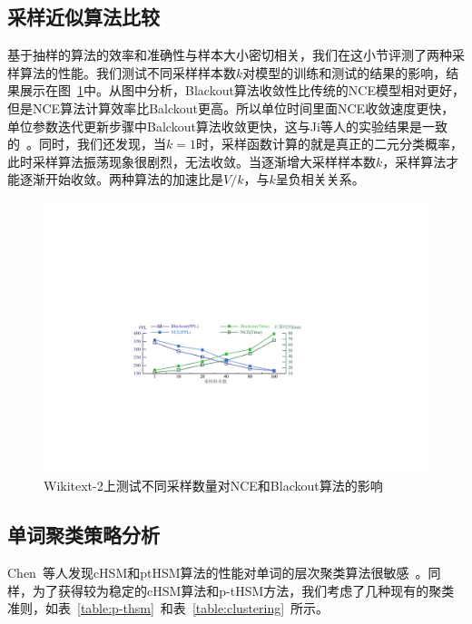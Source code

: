 \subsection{采样近似算法比较}

基于抽样的算法的效率和准确性与样本大小密切相关，我们在这小节评测了两种采样算法的性能。我们测试不同采样样本数$k$对模型的训练和测试的结果的影响，结果展示在图~\ref{fig:blackout_nce}中。从图中分析，Blackout算法收敛性比传统的NCE模型相对更好，但是NCE算法计算效率比Balckout更高。所以单位时间里面NCE收敛速度更快，单位参数迭代更新步骤中Balckout算法收敛更快，这与Ji等人的实验结果是一致的~。同时，我们还发现，当$k=1$时，采样函数计算的就是真正的二元分类概率，此时采样算法振荡现象很剧烈，无法收敛。当逐渐增大采样样本数$k$，采样算法才能逐渐开始收敛。两种算法的加速比是$ V / k $，与$k$呈负相关关系。



\begin{figure}[!ht]
  \centering
  \includegraphics[width=.85\columnwidth]{./figures/nce_blackout.pdf}
  \caption{Wikitext-2上测试不同采样数量对NCE和Blackout算法的影响}\label{fig:blackout_nce}
\end{figure}


\subsection{单词聚类策略分析}
Chen~等人发现cHSM和ptHSM算法的性能对单词的层次聚类算法很敏感~。同样，为了获得较为稳定的cHSM算法和p-tHSM方法，我们考虑了几种现有的聚类准则，如表~\ref{table:p-thsm}~和表~\ref{table:clustering}~所示。


